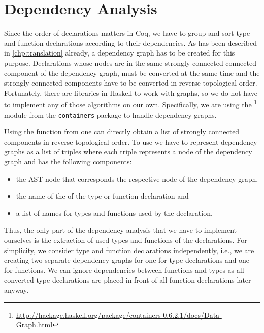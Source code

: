 \section{Dependency Analysis} \label{sec:implementation:dependency-analysis}
Since the order of declarations matters in Coq, we have to group and sort type and function declarations according to their dependencies.
As has been described in \autoref{chp:translation} already, a dependency graph has to be created for this purpose.
Declarations whose nodes are in the same strongly connected connected component of the dependency graph, must be converted at the same time and the strongly connected components have to be converted in reverse topological order.
Fortunately, there are libraries in Haskell to work with graphs, so we do not have to implement any of those algorithms on our own.
Specifically, we are using the  \footnote{\url{http://hackage.haskell.org/package/containers-0.6.2.1/docs/Data-Graph.html}} module from the \texttt{containers} package to handle dependency graphs.

Using the  function from  one can directly obtain a list of strongly connected components in reverse topological order.
To use  we have to represent dependency graphs as a list of triples where each triple represents a node of the dependency graph and has the following components:
\begin{itemize}
  \item the AST node that corresponds the respective node of the dependency graph,
  \item the name of the of the type or function declaration and
  \item a list of names for types and functions used by the declaration.
\end{itemize}
Thus, the only part of the dependency analysis that we have to implement ourselves is the extraction of used types and functions of the declarations.
For simplicity, we consider type and function declarations independently, i.e., we are creating two separate dependency graphs for one for type declarations and one for functions.
We can ignore dependencies between functions and types as all converted type declarations are placed in front of all function declarations later anyway.

